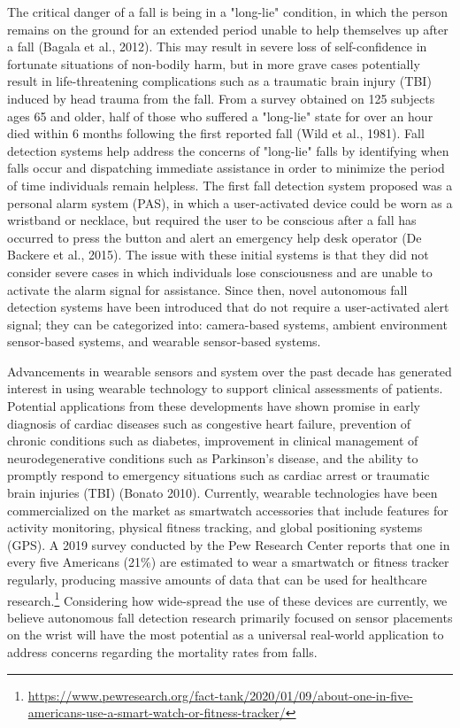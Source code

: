 \documentclass{llncs}
\begin{document}
	The critical danger of a fall is being in a "long-lie" condition, in which the person remains on the ground for an extended period unable to help themselves up after a fall (Bagala et al., 2012).\cite{bagala2012evaluation} This may result in severe loss of self-confidence in fortunate situations of non-bodily harm, but in more grave cases potentially result in life-threatening complications such as a traumatic brain injury (TBI) induced by head trauma from the fall. From a survey obtained on 125 subjects ages 65 and older, half of those who suffered a "long-lie" state for over an hour died within 6 months following the first reported fall (Wild et al., 1981).\cite{wild1981dangerous} Fall detection systems help address the concerns of "long-lie" falls by identifying when falls occur and dispatching immediate assistance in order to minimize the period of time individuals remain helpless. The first fall detection system proposed was a personal alarm system (PAS), in which a user-activated device could be worn as a wristband or necklace, but required the user to be conscious after a fall has occurred to press the button and alert an emergency help desk operator (De Backere et al., 2015).\cite{de2015towards} The issue with these initial systems is that they did not consider severe cases in which individuals lose consciousness and are unable to activate the alarm signal for assistance. Since then, novel autonomous fall detection systems have been introduced that do not require a user-activated alert signal; they can be categorized into: camera-based systems, ambient environment sensor-based systems, and wearable sensor-based systems. 
	
	Advancements in wearable sensors and system over the past decade has generated interest in using wearable technology to support clinical assessments of patients. Potential applications from these developments have shown promise in early diagnosis of cardiac diseases such as congestive heart failure, prevention of chronic conditions such as diabetes, improvement in clinical management of neurodegenerative conditions such as Parkinson's disease, and the ability to promptly respond to emergency situations such as cardiac arrest or traumatic brain injuries (TBI) (Bonato 2010).\cite{bonato2010wearable} Currently, wearable technologies have been commercialized on the market as smartwatch accessories that include features for activity monitoring, physical fitness tracking, and global positioning systems (GPS). A 2019 survey conducted by the Pew Research Center reports that one in every five Americans (21\%) are estimated to wear a smartwatch or fitness tracker regularly, producing massive amounts of data that can be used for healthcare research.\footnote{\url{https://www.pewresearch.org/fact-tank/2020/01/09/about-one-in-five-americans-use-a-smart-watch-or-fitness-tracker/}} Considering how wide-spread the use of these devices are currently, we believe autonomous fall detection research primarily focused on sensor placements on the wrist will have the most potential as a universal real-world application to address concerns regarding the mortality rates from falls.
	
\end{document}
